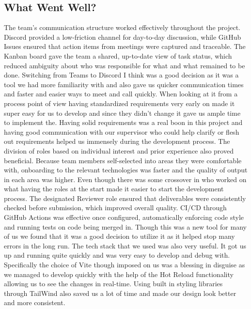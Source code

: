 \documentclass{article}
\begin{document}
\subsection{What Went Well?}

The team's communication structure worked effectively throughout the project. Discord provided a low-friction channel for day-to-day discussion, while GitHub Issues ensured that action items from meetings were captured and traceable. The Kanban board gave the team a shared, up-to-date view of task status, which reduced ambiguity about who was responsible for what and what remained to be done. Switching from Teams to Discord I think was a good decision as it was a tool we had more familiarity with and also gave us quicker communication times and faster and easier ways to meet and call quickly. \newline\newline
When looking at it from a process point of view having standardized requirements very early on made it super easy for us to develop and since they didn't change it gave us ample time to implement the. Having solid requirements was a real boon in this project and having good communication with our supervisor who could help clarify or flesh out requirements helped us immensely during the development process.
\newline\newline
The division of roles based on individual interest and prior experience also proved beneficial. Because team members self-selected into areas they were comfortable with, onboarding to the relevant technologies was faster and the quality of output in each area was higher. Even though there was some crossover in who worked on what having the roles at the start made it easier to start the development process. The designated Reviewer role ensured that deliverables were consistently checked before submission, which improved overall quality. CI/CD through GitHub Actions was effective once configured, automatically enforcing code style and running tests on code being merged in. Though this was a new tool for many of us we found that it was a good decision to utilize it as it helped stop many errors in the long run.
\newline\newline
The tech stack that we used was also very useful. It got us up and running quite quickly and was very easy to develop and debug with. Specifically the choice of Vite though imposed on us was a blessing in disguise as we managed to develop quickly with the help of the Hot Reload functionality allowing us to see the changes in real-time. Using built in styling libraries through TailWind also saved us a lot of time and made our design look better and more consistent.
\end{document}
